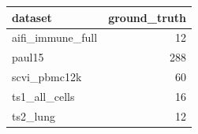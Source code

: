 \begin{tabular}{lr}
\toprule
dataset & ground\_truth \\
\midrule
aifi\_immune\_full & 12 \\
paul15 & 288 \\
scvi\_pbmc12k & 60 \\
ts1\_all\_cells & 16 \\
ts2\_lung & 12 \\
\bottomrule
\end{tabular}
